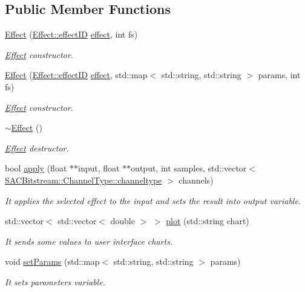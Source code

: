 \subsection*{Public Member Functions}
\begin{DoxyCompactItemize}
\item 
\hyperlink{class_effect_a6ab7116f826b2607ada4630759f6afc5}{Effect} (\hyperlink{class_effect_a6422fe21e9e452943fbc3344884a6fed}{Effect\+::effect\+ID} \hyperlink{class_effect_ae23ae4e48c344fa374730a9ae24e7ad3}{effect}, int fs)
\begin{DoxyCompactList}\small\item\em \hyperlink{class_effect}{Effect} constructor. \end{DoxyCompactList}\item 
\hyperlink{class_effect_a2fbf9d2526c65543157370f68cbed091}{Effect} (\hyperlink{class_effect_a6422fe21e9e452943fbc3344884a6fed}{Effect\+::effect\+ID} \hyperlink{class_effect_ae23ae4e48c344fa374730a9ae24e7ad3}{effect}, std\+::map$<$ std\+::string, std\+::string $>$ params, int fs)
\begin{DoxyCompactList}\small\item\em \hyperlink{class_effect}{Effect} constructor. \end{DoxyCompactList}\item 
\mbox{\label{class_effect_ac26c0a394247e14c9081f875522b5b66}} 
\hyperlink{class_effect_ac26c0a394247e14c9081f875522b5b66}{$\sim$\+Effect} ()
\begin{DoxyCompactList}\small\item\em \hyperlink{class_effect}{Effect} destructor. \end{DoxyCompactList}\item 
bool \hyperlink{class_effect_a6d212ada944f12afbcd8e3e6e623df51}{apply} (float $\ast$$\ast$input, float $\ast$$\ast$output, int samples, std\+::vector$<$ \hyperlink{struct_s_a_c_bitstream_1_1_channel_type_a31c32b34085c06a1c58d920ca28c17c9}{S\+A\+C\+Bitstream\+::\+Channel\+Type\+::channeltype} $>$ channels)
\begin{DoxyCompactList}\small\item\em It applies the selected effect to the input and sets the result into output variable. \end{DoxyCompactList}\item 
std\+::vector$<$ std\+::vector$<$ double $>$ $>$ \hyperlink{class_effect_ac2c35ce7382d627f20879b44be0e8132}{plot} (std\+::string chart)
\begin{DoxyCompactList}\small\item\em It sends some values to user interface charts. \end{DoxyCompactList}\item 
void \hyperlink{class_effect_af0094495d423173463fd3e9cd40789af}{set\+Params} (std\+::map$<$ std\+::string, std\+::string $>$ params)
\begin{DoxyCompactList}\small\item\em It sets parameters variable. \end{DoxyCompactList}\end{DoxyCompactItemize}
